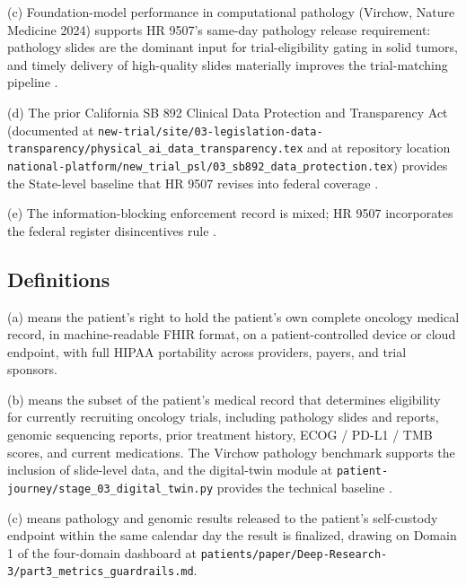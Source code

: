 (c) Foundation-model performance in computational pathology
(Virchow, Nature Medicine 2024) supports HR 9507's same-day
pathology release requirement: pathology slides are the dominant
input for trial-eligibility gating in solid tumors, and timely
delivery of high-quality slides materially improves the trial-matching pipeline \cite{vorontsov2024virchow}.

(d) The prior California SB 892 Clinical Data Protection and
Transparency Act (documented at
\texttt{new-trial/site/03-legislation-data-transparency/physical\_ai\_data\_transparency.tex}
and at repository location
\texttt{national-platform/new\_trial\_psl/03\_sb892\_data\_protection.tex})
provides the State-level baseline that HR 9507 revises into federal
coverage \cite{kawchak_2026_19176370, kawchak_2026_19244918}.

(e) The information-blocking enforcement record is mixed; HR 9507
incorporates the federal register disincentives rule
\cite{federal_register_info_blocking_disincentives_2024}.

\subsection{Definitions}

\hspace{0.5cm} (a)  means the patient's
right to hold the patient's own complete oncology medical record,
in machine-readable FHIR format, on a patient-controlled device or
cloud endpoint, with full HIPAA portability across providers,
payers, and trial sponsors.

(b)  means the subset of the
patient's medical record that determines eligibility for currently
recruiting oncology trials, including pathology slides and reports,
genomic sequencing reports, prior treatment history, ECOG / PD-L1 /
TMB scores, and current medications. The Virchow pathology
benchmark supports the inclusion of slide-level data, and the
digital-twin module at
\texttt{patient-journey/stage\_03\_digital\_twin.py} provides the
technical baseline \cite{vorontsov2024virchow,
kawchak_2026_19119939}.

(c)  means pathology and genomic results
released to the patient's self-custody endpoint within the same
calendar day the result is finalized, drawing on Domain 1 of the
four-domain dashboard at
\texttt{patients/paper/Deep-Research-3/part3\_metrics\_guardrails.md}.

